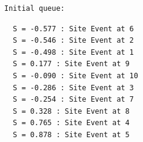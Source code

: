 \documentclass[
  letterpaper,
  DIV=11,
  numbers=noendperiod]{scrartcl}
\newenvironment{Shaded}{\begin{snugshade}}{\end{snugshade}}
\newcommand{\ControlFlowTok}[1]{\textcolor[rgb]{0.00,0.23,0.31}{#1}}
\newcommand{\FunctionTok}[1]{\textcolor[rgb]{0.28,0.35,0.67}{#1}}
\newcommand{\NormalTok}[1]{\textcolor[rgb]{0.00,0.23,0.31}{#1}}
\newcommand{\OtherTok}[1]{\textcolor[rgb]{0.00,0.23,0.31}{#1}}
\newcommand{\SpecialCharTok}[1]{\textcolor[rgb]{0.37,0.37,0.37}{#1}}
\newcommand{\StringTok}[1]{\textcolor[rgb]{0.13,0.47,0.30}{#1}}
\begin{document}
\begin{verbatim}
Initial queue:
\end{verbatim}

\begin{Shaded}
\end{Shaded}

\begin{verbatim}
  S = -0.577 : Site Event at 6 
  S = -0.546 : Site Event at 2 
  S = -0.498 : Site Event at 1 
  S = 0.177 : Site Event at 9 
  S = -0.090 : Site Event at 10 
  S = -0.286 : Site Event at 3 
  S = -0.254 : Site Event at 7 
  S = 0.328 : Site Event at 8 
  S = 0.765 : Site Event at 4 
  S = 0.878 : Site Event at 5 
\end{verbatim}
\end{document}
